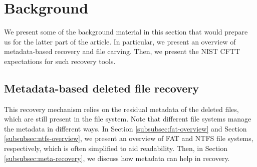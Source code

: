 \section{Background}

We present some of the background material in this section that would prepare
us for the latter part of the article. 
In particular, we present an overview of metadata-based recovery and file carving. 
Then, we present the NIST CFTT expectations for such recovery tools.  


\subsection{Metadata-based deleted file recovery}
This recovery mechanism relies on the residual metadata of the deleted files, 
which are still present in the file system. Note that different file systems
manage the metadata in different ways.
In Section \ref{subsubsec:fat-overview} and Section \ref{subsubsec:ntfs-overview}, 
we present an overview of FAT and NTFS file systems, respectively, which is often
simplified to aid readability. 
Then, in Section \ref{subsubsec:meta-recovery}, we discuss how metadata can help in recovery.

